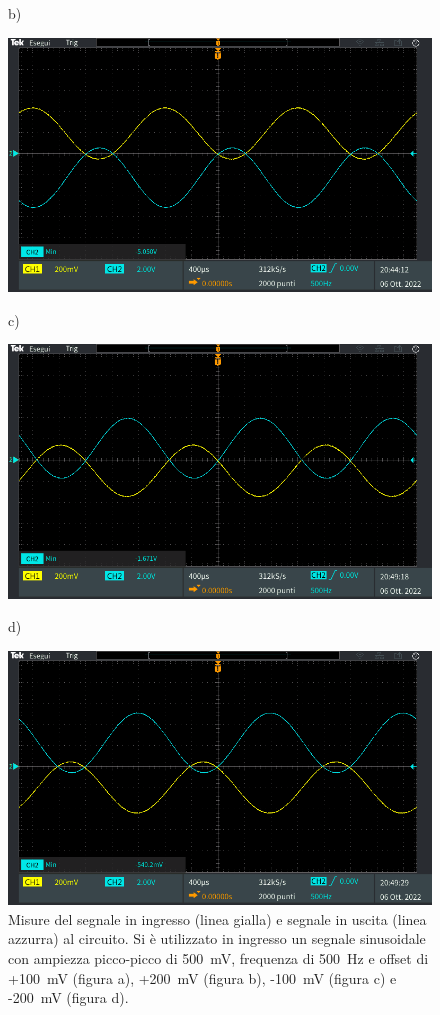 \begin{figure}[h!]
	\centering
	b)
	
	\includegraphics[width=0.8\linewidth]{./ImageFiles/Laboratorio 1/TEK00013}
\end{figure}
\begin{figure}[h!]
	\centering
	c)
	
	\includegraphics[width=0.8\linewidth]{./ImageFiles/Laboratorio 1/TEK00014}
\end{figure}
\begin{figure}[h!]
	\centering
	d)
	
	\includegraphics[width=0.8\linewidth]{./ImageFiles/Laboratorio 1/TEK00015}
	\caption{Misure del segnale in ingresso (linea gialla) e segnale in uscita (linea azzurra) al circuito. Si è utilizzato in ingresso un segnale sinusoidale con ampiezza picco-picco di \SI{500}{\milli\volt}, frequenza di \SI{500}{\hertz} e offset di +\SI{100}{\milli\volt} (figura a), +\SI{200}{\milli\volt} (figura b), -\SI{100}{\milli\volt} (figura c) e -\SI{200}{\milli\volt} (figura d).}
	\label{fig:misure_oscilloscopio_offset}
\end{figure} 


